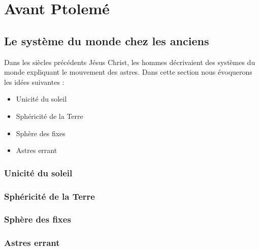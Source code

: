 
\section{Avant Ptolemé}


  \subsection{Le système du monde chez les anciens}

Dans les siècles précédents Jésus Christ, les hommes décrivaient des systèmes du monde expliquant le mouvement des astres. Dans cette section nous évoquerons les idées suivantes :

	\begin{itemize}[leftmargin=1cm, label=, itemsep=0pt]
		\item Unicité du soleil
		\item Sphéricité de la Terre
		\item Sphère des fixes
		\item Astres errant
	\end{itemize}

 \subsubsection{Unicité du soleil}

 \subsubsection{Sphéricité de la Terre}

 \subsubsection{Sphère des fixes}

 \subsubsection{Astres errant}




